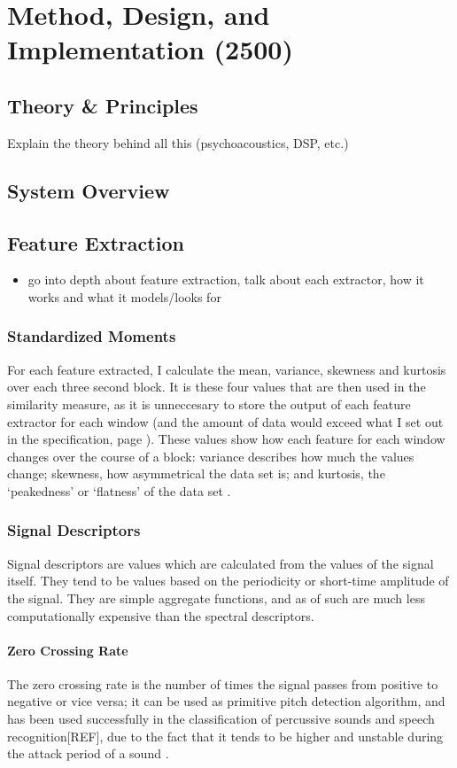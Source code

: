 \chapter{Method, Design, and Implementation (2500)}
\section{Theory \& Principles}
Explain the theory behind all this (psychoacoustics, DSP, etc.)
\section{System Overview}
\section{Feature Extraction}
\begin{itemize}
	\item go into depth about feature extraction, talk about each extractor, how it works and what it models/looks for
\end{itemize}
\subsection{Standardized Moments}
For each feature extracted, I calculate the mean, variance, skewness and kurtosis over each three second block. It is these four values that are then used in the similarity measure, as it is unneccesary to store the output of each feature extractor for each window (and the amount of data would exceed what I set out in the specification, page \pageref{text:spec:requirement:data}). These values show how each feature for each window changes over the course of a block: variance describes how much the values change; skewness, how asymmetrical the data set is; and kurtosis, the `peakedness' or `flatness' of the data set \citep{Siegrist2007}.
\subsection{Signal Descriptors}
Signal descriptors are values which are calculated from the values of the signal itself. They tend to be values based on the periodicity or short-time amplitude of the signal. They are simple aggregate functions, and as of such are much less computationally expensive than the spectral descriptors.
\subsubsection{Zero Crossing Rate}

The zero crossing rate is the number of times the signal passes from positive to negative or vice versa; it can be used as primitive pitch detection algorithm, and has been used successfully in the classification of percussive sounds \citep{Gouyon2000} and speech recognition[REF], due to the fact that it tends to be higher and unstable during the attack period of a sound \citep{Schwarz2004}.
